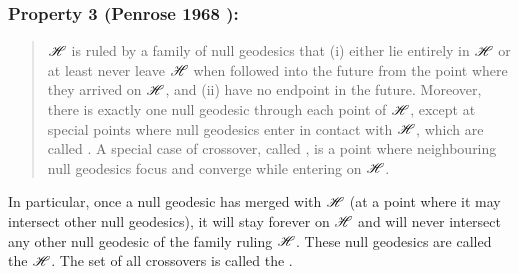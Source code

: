 \subsubsection{Property 3 (Penrose 1968 \cite{Penro68}):}
\begin{quote}
$\mathscr{H}$ is ruled by a family of null geodesics that (i) either lie entirely
in $\mathscr{H}$ or at least never leave $\mathscr{H}$ when followed into the future from the
point where they arrived on $\mathscr{H}$, and
(ii) have no endpoint in the future.
Moreover, there is exactly one null geodesic through each point of $\mathscr{H}$,
except at special points where null geodesics enter in contact with $\mathscr{H}$, which are
called . A special case
of crossover, called , is a point
where neighbouring null geodesics focus and converge while entering on $\mathscr{H}$.
\end{quote}
In particular, once a null geodesic has
merged with $\mathscr{H}$ (at a point where it may intersect other null geodesics),
it will stay forever on $\mathscr{H}$ and will never intersect any other null geodesic
of the family ruling $\mathscr{H}$. These null geodesics are called the
 $\mathscr{H}$.
The set of all crossovers is called the 
\cite{Siino98a,Siino98b,Brill14}.

